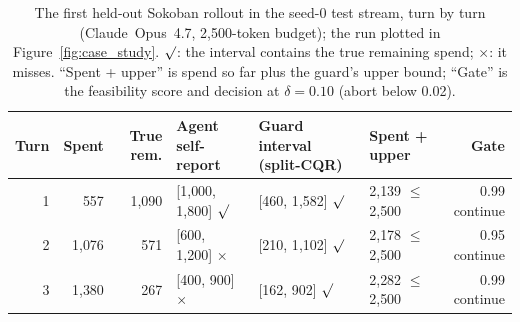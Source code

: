 \documentclass{article}
\begin{document}
\begin{table}[t]
\centering
\caption{The first held-out Sokoban rollout in the seed-0 test stream, turn by turn (Claude~Opus~4.7, 2{,}500-token budget); the run plotted in Figure~\ref{fig:case_study}. $\surd$: the interval contains the true remaining spend; $\times$: it misses. ``Spent + upper'' is spend so far plus the guard's upper bound; ``Gate'' is the feasibility score and decision at $\delta{=}0.10$ (abort below 0.02).}
\label{tab:case_study}
\footnotesize
\setlength{\tabcolsep}{4pt}
\begin{tabular}{@{}rrrlllr@{}}
\toprule
Turn & Spent & True rem. & Agent self-report & Guard interval (split-CQR) & Spent + upper & Gate \\
\midrule
1 & 557 & 1{,}090 & [1{,}000, 1{,}800] $\surd$ & [460, 1{,}582] $\surd$ & 2{,}139 $\leq$ 2{,}500 & 0.99 continue \\
2 & 1{,}076 & 571 & [600, 1{,}200] $\times$ & [210, 1{,}102] $\surd$ & 2{,}178 $\leq$ 2{,}500 & 0.95 continue \\
3 & 1{,}380 & 267 & [400, 900] $\times$ & [162, 902] $\surd$ & 2{,}282 $\leq$ 2{,}500 & 0.99 continue \\
\bottomrule
\end{tabular}
\end{table}
\end{document}
